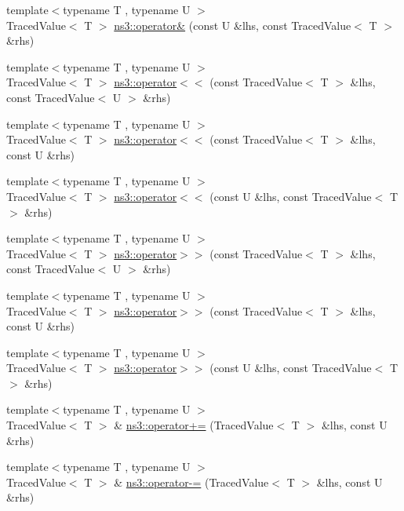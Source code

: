 \begin{DoxyCompactItemize}
\item 
{\footnotesize template$<$typename T , typename U $>$ }\\Traced\+Value$<$ T $>$ \hyperlink{group__tracing_ga11dc54b38fdc344402bda1a396f3ddcc}{ns3\+::operator\&} (const U \&lhs, const Traced\+Value$<$ T $>$ \&rhs)
\item 
{\footnotesize template$<$typename T , typename U $>$ }\\Traced\+Value$<$ T $>$ \hyperlink{group__tracing_ga2ecec8584d08f46cb3a7a08e67803e31}{ns3\+::operator$<$$<$} (const Traced\+Value$<$ T $>$ \&lhs, const Traced\+Value$<$ U $>$ \&rhs)
\item 
{\footnotesize template$<$typename T , typename U $>$ }\\Traced\+Value$<$ T $>$ \hyperlink{group__tracing_ga55f6e82af35179ce2f5d47dde1fc1b0d}{ns3\+::operator$<$$<$} (const Traced\+Value$<$ T $>$ \&lhs, const U \&rhs)
\item 
{\footnotesize template$<$typename T , typename U $>$ }\\Traced\+Value$<$ T $>$ \hyperlink{group__tracing_gaebb15626a525de5701cea5dac0239c4e}{ns3\+::operator$<$$<$} (const U \&lhs, const Traced\+Value$<$ T $>$ \&rhs)
\item 
{\footnotesize template$<$typename T , typename U $>$ }\\Traced\+Value$<$ T $>$ \hyperlink{group__tracing_gab18fddbeebddf61b662f4b07cecee4d2}{ns3\+::operator$>$$>$} (const Traced\+Value$<$ T $>$ \&lhs, const Traced\+Value$<$ U $>$ \&rhs)
\item 
{\footnotesize template$<$typename T , typename U $>$ }\\Traced\+Value$<$ T $>$ \hyperlink{group__tracing_gab458d5235e4f4b5831819008b3a1bf57}{ns3\+::operator$>$$>$} (const Traced\+Value$<$ T $>$ \&lhs, const U \&rhs)
\item 
{\footnotesize template$<$typename T , typename U $>$ }\\Traced\+Value$<$ T $>$ \hyperlink{group__tracing_ga83fb7bddcd05424864a3ef8465362747}{ns3\+::operator$>$$>$} (const U \&lhs, const Traced\+Value$<$ T $>$ \&rhs)
\item 
{\footnotesize template$<$typename T , typename U $>$ }\\Traced\+Value$<$ T $>$ \& \hyperlink{group__tracing_ga9323132fbeca95f9d5c917c72212aa06}{ns3\+::operator+=} (Traced\+Value$<$ T $>$ \&lhs, const U \&rhs)
\item 
{\footnotesize template$<$typename T , typename U $>$ }\\Traced\+Value$<$ T $>$ \& \hyperlink{group__tracing_ga4457592ace84e2565e8800a00e4d3b01}{ns3\+::operator-\/=} (Traced\+Value$<$ T $>$ \&lhs, const U \&rhs)

\end{DoxyCompactItemize}

